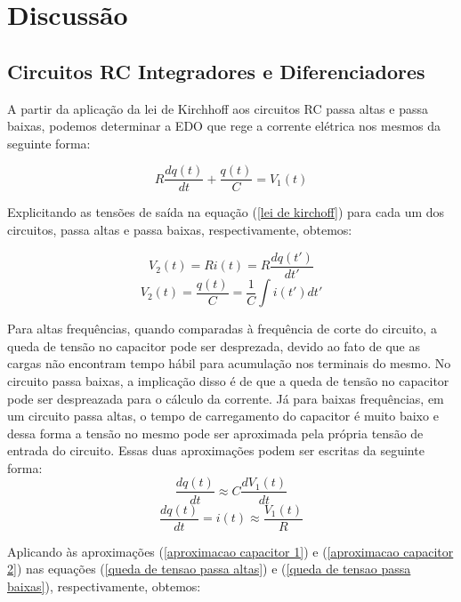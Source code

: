 \documentclass[a4paper]{article}
\begin{document}
\section{Discussão}

\subsection{Circuitos RC Integradores e Diferenciadores}

A partir da aplicação da lei de Kirchhoff aos circuitos RC passa altas e passa baixas, podemos determinar a EDO que rege a corrente elétrica nos mesmos da seguinte forma:

\begin{equation} \label{lei de kirchoff}
R\frac{dq(t)}{dt}+\frac{q(t)}{C}=V_{1}(t)
\end{equation}

Explicitando as tensões de saída na equação (\ref{lei de kirchoff}) para cada um dos circuitos, passa altas e passa baixas, respectivamente, obtemos:

\begin{equation} \label{queda de tensao passa altas}
V_{2}(t)=Ri(t)=R\frac{dq(t')}{dt'}
\end{equation}
\begin{equation} \label{queda de tensao passa baixas}
V_{2}(t)=\frac{q(t)}{C}=\frac{1}{C}\int i(t')dt'
\end{equation}

Para altas frequências, quando comparadas à frequência de corte do circuito, a queda de tensão no capacitor pode ser desprezada, devido ao fato de que as cargas não encontram tempo hábil para acumulação nos terminais do mesmo. No circuito passa baixas, a implicação disso é de que 
a queda de tensão no capacitor pode ser despreazada para o cálculo da corrente. Já para baixas frequências, em um circuito passa altas, o tempo de carregamento do capacitor é muito baixo e dessa forma a tensão no mesmo pode ser aproximada pela própria tensão de entrada do circuito. Essas duas aproximações podem ser escritas da seguinte forma:
\begin{equation} \label{aproximacao capacitor 1}
\frac{dq(t)}{dt}\approx C\frac{dV_{1}(t)}{dt}
\end{equation}
\begin{equation} \label{aproximacao capacitor 2}
\frac{dq(t)}{dt}=i(t)\approx \frac{V_{1}(t)}{R}
\end{equation}

Aplicando às aproximações (\ref{aproximacao capacitor 1}) e (\ref{aproximacao capacitor 2}) nas equações (\ref{queda de tensao passa altas}) e (\ref{queda de tensao passa baixas}), respectivamente, obtemos: 
\end{document}

